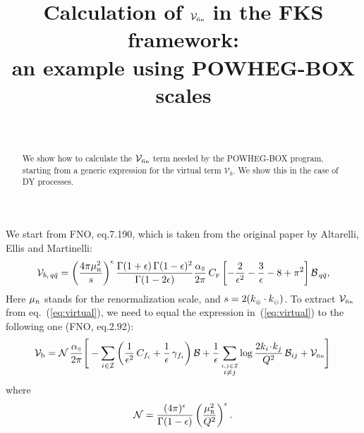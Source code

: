 \documentclass[11pt]{article} %
\title{Calculation of $\matSV_{\sss\rm fin}$ in the FKS framework:\\
an example using POWHEG-BOX scales}
\author{~}
\def\({\left(}
\def\){\right)}
\newcommand\sss{\mathchoice%
{\displaystyle}%
{\scriptstyle}%
{\scriptscriptstyle}%
{\scriptscriptstyle}%
}
\newcommand\nplus{\oplus}
\newcommand\nminus{\ominus}
\newcommand\splus{{\sss \nplus}}
\newcommand\sminus{{\sss \nminus}}
\newcommand\ep{\epsilon}
\newcommand\as{\alpha_{\sss\rm S}}
\newcommand\asotpi{\frac{\as}{2\pi}}
\newcommand\matB{{\cal B}}
\newcommand\matVb{{\cal V}_{\bare}}
\newcommand\matI{{\cal I}}
\newcommand\matSV{{\cal V}}
\newcommand\bare{{\rm b}}
\newcommand\mydot{\!\cdot\!}
\newcommand\CF{C_{\sss\rm F}}
\newcommand\muR{\mu_{\sss\rm R}}
\newcommand\qb{\bar{q}}
\def\reff#1{(\ref{#1})}
\begin{document}
\maketitle
\begin{abstract}{}
We show how to calculate the $\matSV_{\sss\rm fin}$ term needed by the
POWHEG-BOX program, starting from a generic expression for the virtual
term $\mathcal{V}_{b}$.  We show this in the case of DY processes.
\end{abstract}


We start from FNO, eq.7.190, which is taken from the original paper by
Altarelli, Ellis and Martinelli:
\begin{equation}
\label{eq:virtual}
  \mathcal{V}_{b,\,q\qb} = \left( \frac{4 \pi \muR^2}{s}
  \right)^{\epsilon} \frac{\Gamma (1 + \epsilon) \, \Gamma (1 -
  \epsilon)^2}{\Gamma (1 - 2 \epsilon)}  \frac{\as}{2 \pi}\, \CF \left[ -
  \frac{2}{\epsilon^2} - \frac{3}{\epsilon} - 8 + \pi^2
  \right]\mathcal{B}_{\,q\qb},
\end{equation}
Here $\muR$ stands for the renormalization scale, and
$s=2(k_\splus\cdot k_\sminus)$. 
To extract $\matSV_{\sss\rm fin}$ from eq.~\reff{eq:virtual},
we need to equal the expression in~\reff{eq:virtual} to the following one
(FNO, eq.2.92):
\begin{equation} 
\matVb={\cal N}\,\asotpi
\Bigg[-\sum_{i \in \matI} \left(\frac{1}{\ep^2} \,C_{f_i}+
\frac{1}{\ep} \,\gamma_{f_i}\right)\matB
+\frac{1}{\ep}\sum_{\stackrel{i,j \in \matI}{i\ne j}}\log\frac{2k_i\mydot
  k_j}{Q^2}\, 
\matB_{ij}+\matSV_{\sss\rm fin}\Bigg]\,
\label{eq:FKSoneloop}
\end{equation}
where
\begin{equation}\label{eq:virtnorm}
{\cal N}=
\frac{(4\pi)^\ep}{\Gamma(1-\ep)}
\left(\frac{\muR^2}{Q^2}\right)^\ep.
\end{equation}
\end{document}
